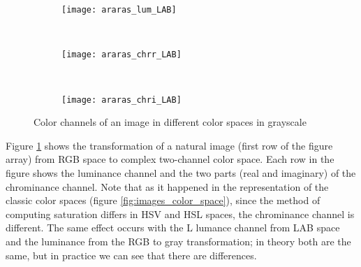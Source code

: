 \begin{figure}[!ht]
    \begin{subfigure}[t]{\textwidth+20pt\relax}
    	\texttt{[image: araras\_lum\_LAB]}
    \end{subfigure}     
    ~ %
    \begin{subfigure}[b]{0.3\textwidth}
        \texttt{[image: araras\_chrr\_LAB]}
    \end{subfigure}
    ~ %
    \begin{subfigure}[b]{0.3\textwidth}
        \texttt{[image: araras\_chri\_LAB]}
    \end{subfigure} \vspace{5pt} 
        
    \caption{Color channels of an image in different color spaces in grayscale}\label{fig:images_color_complex_space}    
\end{figure}

Figure \ref{fig:images_color_complex_space} shows the transformation of a natural image (first row of the figure array) from RGB space to complex two-channel color space. Each row in the figure shows the luminance channel and the two parts (real and imaginary) of the chrominance channel. Note that as it happened in the representation of the classic color spaces (figure \ref{fig:images_color_space}), since the method of computing saturation differs in HSV and HSL spaces, the chrominance channel is different. The same effect occurs with the L lumance channel from LAB space and the luminance from the RGB to gray transformation; in theory both are the same, but in practice we can see that there are differences.


%
%
%
%
%
%


